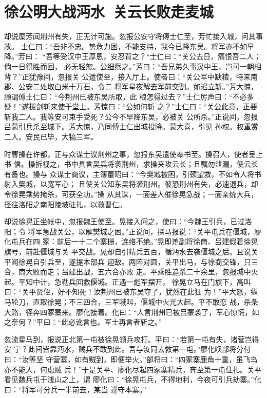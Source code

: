 \chapter{徐公明大战沔水~关云长败走麦城}

却说糜芳闻荆州有失，正无计可施。忽报公安守将傅士仁至，芳忙接入城，问其事故。
士仁曰：“吾非不忠。势危力困，不能支持，我今已降东吴。将军亦不如早降。”芳曰：
“吾等受汉中王厚恩，安忍背之？“士仁曰：“关公去日，痛恨吾二人；倘一日得胜而回，
必无轻恕。公细察之。”芳曰：“吾兄弟久事汉中王，岂可一朝相背？”正犹豫间，忽报关
公遣使至，接入厅上。使者曰：“关公军中缺粮，特来南郡、公安二处取白米十万石，令二
将军星夜解去军前交割。如迟立斩。”芳大惊，顾谓傅士仁曰：“今荆州已被东吴所取，此
粮怎得过去？”士仁厉声曰：“不必多疑！”遂拔剑斩来使于堂上。芳惊曰：“公如何斩
之？”士仁曰：“关公此意，正要斩我二人。我等安可束手受死？公今不早降东吴，必被关
公所杀。”正说间，忽报吕蒙引兵杀至城下。芳大惊，乃同傅士仁出城投降。蒙大喜，引见
孙权。权重赏二人。安民已毕，大犒三军。

时曹操在许都，正与众谋士议荆州之事，忽报东吴遣使奉书至。操召人，使者呈上书
信。操拆视之，书中具言吴兵将袭荆州，求操夹攻云长；且嘱勿泄漏，使云长有备也。操与
众谋士商议，主簿董昭曰：“今樊城被困，引颈望救，不如令人将书射入樊城，以宽军心；
且使关公知东吴将袭荆州。彼恐荆州有失，必速退兵，却令徐晃乘势掩杀，可获全功。”操
从其谋，一面差人催徐晃急战；一面亲统大兵，径往洛阳之南阳陵坡驻扎，以救曹仁。

却说徐晃正坐帐中，忽报魏王使至。晃接入问之，使曰：“今魏王引兵，已过洛阳；令
将军急战关公，以解樊城之困。”正说间，探马报说：“关平屯兵在偃城，廖化屯兵在四
冢：前后一十二个寨栅，连络不绝。”晃即差副将徐商、吕建假着徐晃旗号，前赴偃城与关
平交战。晃却自引精兵五百，循沔水去袭偃城之后。且说关平闻徐晃自引兵至，遂提本部兵
迎敌。两阵对圆，关平出马，与徐商交锋，只三合，商大败而走；吕建出战，五六合亦败
走。平乘胜追杀二十余里，忽报城中火起。平知中计，急勒兵回救偃城。正遇一彪军摆开，
徐晃立马在门旗下，高叫曰：“关平贤侄，好不知死！汝荆州已被东吴夺了，犹然在此狂
为！”平大怒，纵马轮刀，直取徐晃；不三四合，三军喊叫，偃城中火光大起。平不敢恋
战，杀条大路，径奔四冢寨来。廖化接着。化曰：“人言荆州已被吕蒙袭了，军心惊慌，如
之奈何？”平曰：“此必讹言也。军士再言者斩之。”

忽流星马到，报说正北第一屯被徐晃领兵攻打。平曰：“若第一屯有失，诸营岂得安
宁？此间皆靠沔水，贼兵不敢到此。吾与汝同去救第一屯。”廖化唤部将分付曰：“汝等坚
守营寨，如有贼到，即便举火。”部将曰：“四冢寨鹿角十重，虽飞鸟亦不能入，何虑贼
兵！”于是关平、廖化尽起四冢寨精兵，奔至第一屯住扎。关平看见魏兵屯于浅山之上，谓
廖化曰：“徐晃屯兵，不得地利，今夜可引兵劫寨。”化曰：“将军可分兵一半前去，某当
谨守本寨。”

